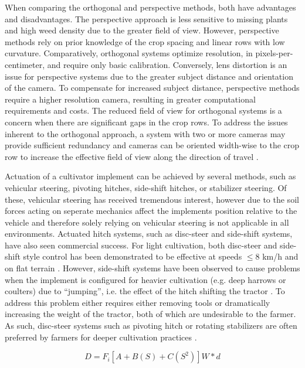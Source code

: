 \documentclass[authoryear]{elsarticle}
\begin{document}
When comparing the orthogonal and perspective methods, both have
advantages and disadvantages. The perspective approach is less
sensitive to missing plants and high weed density due to the greater
field of view. However, perspective methods rely on prior knowledge of
the crop spacing and linear rows with low curvature. Comparatively,
orthogonal systems optimize resolution, in pixels-per-centimeter, and
require only basic calibration. Conversely, lens distortion is an
issue for perspective systems due to the greater subject distance and
orientation of the camera. To compensate for increased subject
distance, perspective methods require a higher resolution camera,
resulting in greater computational requirements and costs. The reduced
field of view for orthogonal systems is a concern when there are
significant gaps in the crop rows. To address the issues inherent to
the orthogonal approach, a system with two or more cameras may provide
sufficient redundancy and cameras can be oriented width-wise to the
crop row to increase the effective field of view along the direction
of travel \citep{slaughter1995patent}.

Actuation of a cultivator implement can be achieved by several
methods, such as vehicular steering, pivoting hitches, side-shift
hitches, or stabilizer steering. Of these, vehicular steering has
received tremendous interest, however due to the soil forces acting on
seperate mechanics affect the implements position relative to the
vehicle and therefore solely relying on vehicular steering is not
applicable in all environments. Actuated hitch systems, such as
disc-steer and side-shift systems, have also seen commercial
success. For light cultivation, both disc-steer and side-shift style
control has been demonstrated to be effective at speeds $\le$8 km/h
and on flat terrain \citep{kocher2000}. However, side-shift systems
have been observed to cause problems when the implement is configured
for heavier cultivation (e.g. deep harrows or coulters) due to
“jumping”, i.e. the effect of the hitch shifting the tractor
. To address this problem either requires either
removing tools or dramatically increasing the weight of the tractor,
both of which are undesirable to the farmer. As such, disc-steer
systems such as pivoting hitch or rotating stabilizers are often
preferred by farmers for deeper cultivation practices \citep{desperrier2014}.

\begin{equation}
  D = F_{i} \left[ A + B(S) + C(S^2) \right] W * d
  \label{eq:soil_resistance}
\end{equation}
\end{document}
